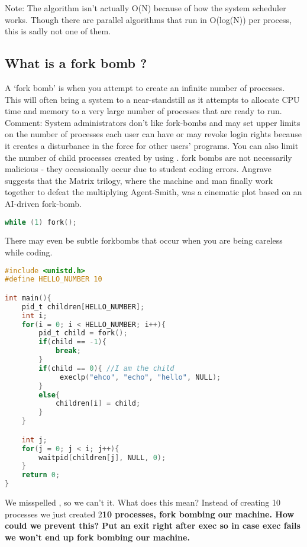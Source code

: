 Note: The algorithm isn't actually O(N) because of how the system scheduler works. Though there are parallel algorithms that run in O(log(N)) per process, this is sadly not one of them.

\subsection{What is a fork bomb ?}\label{what-is-a-fork-bomb}

A `fork bomb' is when you attempt to create an infinite number of processes. This will often bring a system to a near-standstill as it attempts to allocate CPU time and memory to a very large number of processes that are ready to run. Comment: System administrators don't like fork-bombs and may set upper limits on the number of processes each user can have or may revoke login rights because it creates a disturbance in the force for other users' programs. You can also limit the number of child processes created by using . fork bombs are not necessarily malicious - they occasionally occur due to student coding errors. Angrave suggests that the Matrix trilogy, where the machine and man finally work together to defeat the multiplying Agent-Smith, was a cinematic plot based on an AI-driven fork-bomb.

\begin{lstlisting}[language=C]
while (1) fork();
\end{lstlisting}

There may even be subtle forkbombs that occur when you are being careless while coding.

\begin{lstlisting}[language=C]
#include <unistd.h>
#define HELLO_NUMBER 10

int main(){
    pid_t children[HELLO_NUMBER];
    int i;
    for(i = 0; i < HELLO_NUMBER; i++){
        pid_t child = fork();
        if(child == -1){
            break;
        }
        if(child == 0){ //I am the child
             execlp("ehco", "echo", "hello", NULL);
        }
        else{
            children[i] = child;
        }
    }

    int j;
    for(j = 0; j < i; j++){
        waitpid(children[j], NULL, 0);
    }
    return 0;
}
\end{lstlisting}

We misspelled , so we can't  it. What does this mean? Instead of creating 10 processes we just created 2\textbf{10 processes, fork bombing our machine. How could we prevent this? Put an exit right after exec so in case exec fails we won't end up fork bombing our machine.}

